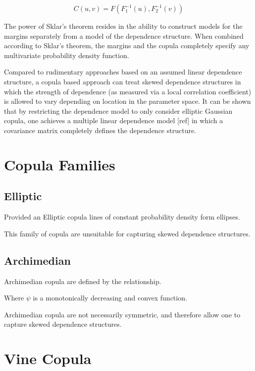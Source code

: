 \begin{equation}
C(u, v) = F(F_1^{-1}(u), F_2^{-1}(v))
\label{sklar2}
\end{equation}

The power of Sklar's theorem resides in the ability to construct
models for the margins separately from a model of the dependence structure.
When combined according to Sklar's theorem, the margins and the copula completely
specify any multivariate probability density function.

Compared to rudimentary approaches based on an assumed linear dependence structure,
a copula based approach can treat skewed dependence structures in which the
strength of dependence (as measured via a local correlation coefficient) is allowed
to vary depending on location in the parameter space.
It can be shown that by restricting the dependence model to only consider elliptic Gaussian
copula, one achieves a multiple linear dependence model [ref] in which a covariance matrix
completely defines the dependence structure.

\section*{Copula Families}

\subsection*{Elliptic}

Provided an Elliptic copula lines of constant probability density form ellipses.

This family of copula are unsuitable for capturing skewed dependence structures.

\subsection*{Archimedian}

Archimedian copula are defined by the relationship.

Where $\psi$ is a monotonically decreasing and convex function.

Archimedian copula are not necessarily symmetric, and therefore allow one to capture
skewed dependence structures.

\section{Vine Copula} 

